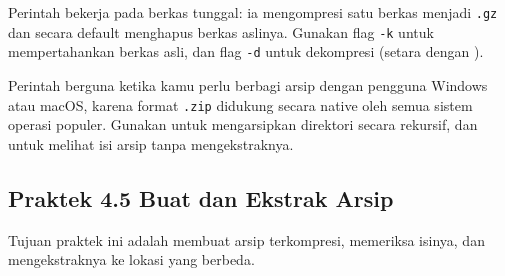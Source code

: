 Perintah  bekerja pada berkas tunggal: ia mengompresi satu berkas menjadi
\texttt{.gz} dan secara default menghapus berkas aslinya. Gunakan flag \texttt{-k} untuk
mempertahankan berkas asli, dan flag \texttt{-d} untuk dekompresi (setara dengan ).

Perintah  berguna ketika kamu perlu berbagi arsip dengan pengguna Windows atau
macOS, karena format \texttt{.zip} didukung secara native oleh semua sistem operasi populer.
Gunakan  untuk mengarsipkan direktori secara rekursif, dan 
untuk melihat isi arsip tanpa mengekstraknya.

\subsection*{Praktek 4.5 Buat dan Ekstrak Arsip}

Tujuan praktek ini adalah membuat arsip terkompresi, memeriksa isinya, dan mengekstraknya
ke lokasi yang berbeda.

